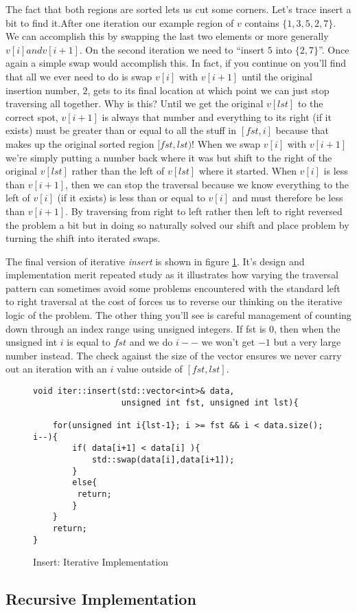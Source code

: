 \documentclass[]{tufte-handout}
\begin{document}
The fact that both regions are sorted lets us cut some corners. Let's trace insert a bit to find it.After one iteration our example region of $v$ contains $\{1,3,5,2,7\}$. We can accomplish this by swapping the last two elements or more generally $v[i] and v[i+1]$. On the second iteration we need to ``insert $5$ into $\{2,7\}$''.  Once again a simple swap would accomplish this. In fact, if you continue on you'll find that all we ever need to do is swap $v[i]$ with $v[i+1]$ until the original insertion number, $2$, gets to its final location at which point we can just stop traversing all together. Why is this?  Until we get the original $v[lst]$ to the correct spot, $v[i+1]$ is always that number and everything to its right (if it exists) must be greater than or equal to all the stuff in $[fst,i]$ because that makes up the original sorted region $[fst,lst)$! When we swap $v[i]$ with $v[i+1]$ we're simply putting a number back where it was but shift to the right of the original $v[lst]$ rather than the left of $v[lst]$ where it started. When $v[i]$ is less than $v[i+1]$, then we can stop the traversal because we know everything to the left of $v[i]$ (if it exists) is less than or equal to $v[i]$ and must therefore be less than $v[i+1]$. By traversing from right to left rather then left to right reversed the problem a bit but in doing so naturally solved our shift and place problem by turning the shift into iterated swaps. 

The final version of iterative \textit{insert} is shown in figure \ref{code:insertiter}. It's design and implementation merit repeated study as it illustrates how varying the traversal pattern can sometimes avoid some problems encountered with the standard left to right traversal at the cost of forces us to reverse our thinking on the iterative logic of the problem. The other thing you'll see is careful management of counting down through an index range using unsigned integers. If fst is $0$, then when the unsigned int $i$ is equal to $fst$ and we do $i--$ we won't get $-1$ but a very large number instead. The check against the size of the vector ensures we never carry out an iteration with an $i$ value outside of $[fst,lst]$.  
\begin{figure}[htpb!]
\begin{lstlisting}
void iter::insert(std::vector<int>& data,
	    		  unsigned int fst, unsigned int lst){

	for(unsigned int i{lst-1}; i >= fst && i < data.size(); i--){
    	if( data[i+1] < data[i] ){
			std::swap(data[i],data[i+1]);
      	}
      	else{
		 return;
        }
    }
    return;    
}
\end{lstlisting}
\label{code:insertiter}
\caption{Insert: Iterative Implementation}
\end{figure}



\subsection{Recursive Implementation}
\end{document}
